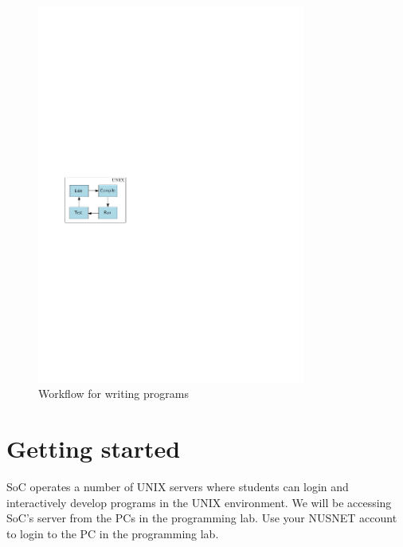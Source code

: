 \begin{frame}
\begin{figure}
\begin{center}
\includegraphics[page=1,width=250pt]{flow}
\caption{Workflow for writing programs}
\label{fig:flow}
\end{center}
\end{figure}
\end{frame}

\section{Getting started} %
SoC operates a number of UNIX servers where students can login and interactively
develop programs in the UNIX environment.  We will be accessing SoC's 
server from the PCs in the programming lab.  Use your NUSNET account to login to
the PC in the programming lab.  

